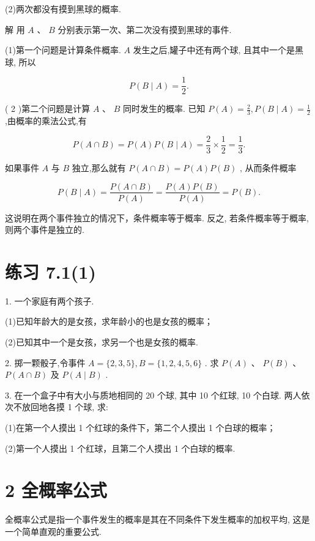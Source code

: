 \documentclass[10pt]{article}
\begin{document}
(2)两次都没有摸到黑球的概率.

解 用 \(A\text{ 、 }B\) 分别表示第一次、第二次没有摸到黑球的事件.

(1)第一个问题是计算条件概率. \(A\) 发生之后,罐子中还有两个球, 且其中一个是黑球, 所以

\[
P\left( {B \mid  A}\right)  = \frac{1}{2}.
\]

( 2 )第二个问题是计算 \(A\) 、 \(B\) 同时发生的概率. 已知 \(P\left( A\right)  = \frac{2}{3},P\left( {B \mid  A}\right)  = \frac{1}{2}\) ,由概率的乘法公式,有

\[
P\left( {A \cap  B}\right)  = P\left( A\right) P\left( {B \mid  A}\right)  = \frac{2}{3} \times  \frac{1}{2} = \frac{1}{3}.
\]

如果事件 \(A\) 与 \(B\) 独立,那么就有 \(P\left( {A \cap  B}\right)  = P\left( A\right) P\left( B\right)\) , 从而条件概率

\[
P\left( {B \mid  A}\right)  = \frac{P\left( {A \cap  B}\right) }{P\left( A\right) } = \frac{P\left( A\right) P\left( B\right) }{P\left( A\right) } = P\left( B\right) .
\]

这说明在两个事件独立的情况下，条件概率等于概率. 反之, 若条件概率等于概率, 则两个事件是独立的.

\section*{练习 7.1(1)}

1. 一个家庭有两个孩子.

(1)已知年龄大的是女孩，求年龄小的也是女孩的概率；

(2)已知其中一个是女孩，求另一个也是女孩的概率.

2. 掷一颗骰子,令事件 \(A = \{ 2,3,5\} ,B = \{ 1,2,4,5,6\}\) . 求 \(P\left( A\right) \text{ 、 }P\left( B\right)\) 、 \(P\left( {A \cap  B}\right)\) 及 \(P\left( {A \mid  B}\right)\) .

3. 在一个盒子中有大小与质地相同的 20 个球, 其中 10 个红球, 10 个白球. 两人依次不放回地各摸 1 个球, 求:

(1)在第一个人摸出 1 个红球的条件下，第二个人摸出 1 个白球的概率；

(2)第一个人摸出 1 个红球，且第二个人摸出 1 个白球的概率.

\section*{2 全概率公式}

全概率公式是指一个事件发生的概率是其在不同条件下发生概率的加权平均, 这是一个简单直观的重要公式.
\end{document}
